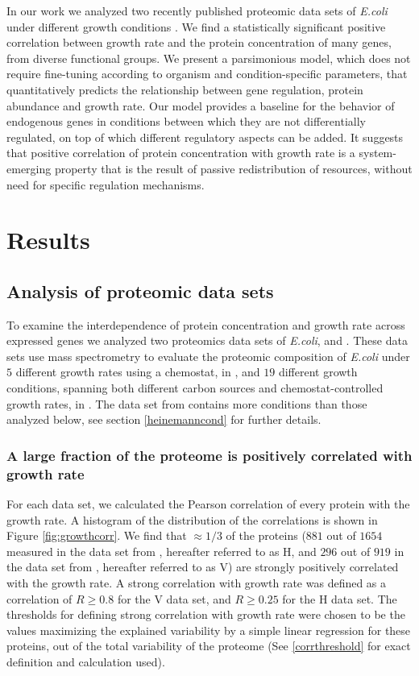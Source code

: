 \documentclass[notitlepage]{article}
\begin{document}
In our work we analyzed two recently published proteomic data sets of \emph{E.coli} under different growth conditions \cite{Valgepea2013,Heinemann2014}.
We find a statistically significant positive correlation between growth rate and the protein concentration of many genes, from diverse functional groups.
We present a parsimonious model, which does not require fine-tuning according to organism and condition-specific parameters, that quantitatively predicts the relationship between gene regulation, protein abundance and growth rate.
Our model provides a baseline for the behavior of endogenous genes in conditions between which they are not differentially regulated, on top of which different regulatory aspects can be added.
It suggests that positive correlation of protein concentration with growth rate is a system-emerging property that is the result of passive redistribution of resources, without need for specific regulation mechanisms.

\section{Results}
\subsection{Analysis of proteomic data sets}
To examine the interdependence of protein concentration and growth rate across expressed genes we analyzed two proteomics data sets of \emph{E.coli}, \cite{Valgepea2013} and \cite{Heinemann2014}.
These data sets use mass spectrometry to evaluate the proteomic composition of \emph{E.coli} under $5$ different growth rates using a chemostat, in \cite{Valgepea2013}, and $19$ different growth conditions, spanning both different carbon sources and chemostat-controlled growth rates, in \cite{Heinemann2014}.
The data set from \cite{Heinemann2014} contains more conditions than those analyzed below, see section \ref{heinemanncond} for further details.
\subsubsection{A large fraction of the proteome is positively correlated with growth rate}
For each data set, we calculated the Pearson correlation of every protein with the growth rate.
A histogram of the distribution of the correlations is shown in Figure \ref{fig:growthcorr}.
We find that $\approx 1/3$ of the proteins ($881$ out of $1654$ measured in the data set from \cite{Heinemann2014}, hereafter referred to as H, and $296$ out of $919$ in the data set from \cite{Valgepea2013}, hereafter referred to as V) are strongly positively correlated with the growth rate.
A strong correlation with growth rate was defined as a correlation of $R\geq 0.8$ for the V data set, and $R\geq 0.25$ for the H data set.
The thresholds for defining strong correlation with growth rate were chosen to be the values maximizing the explained variability by a simple linear regression for these proteins, out of the total variability of the proteome (See \ref{corrthreshold} for exact definition and calculation used).
\end{document}

